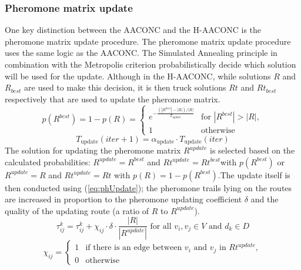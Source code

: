 \documentclass{article}
\begin{document}
	\subsubsection{Pheromone matrix update}
	One key distinction between the AACONC and the H-AACONC is the pheromone matrix update procedure.
	The pheromone matrix update procedure uses the same logic as the AACONC. The Simulated Annealing principle in combination with the Metropolis criterion probabilistically decide which solution will be used for the update. Although in the H-AACONC, while solutions $R$ and $R_{best}$ are used to make this decision, it is then truck solutions $Rt$ and $Rt_{best}$ respectively that are used to update the pheromone matrix.
	\begin{equation}
		p(R^{best}) = 1 - p(R) = 
		\begin{cases}
			e^{-\frac{(|R^{best}| - |R|)/|R|}{T_{update}}} & \text{for } |R^{best}| > |R|, \\
			1 & \text{otherwise}
		\end{cases}
		\label{eq:SA}
	\end{equation}
	\begin{equation}
		T_{\text{update}}(iter + 1) = \alpha_{\text{update}} \cdot T_{\text{update}}(iter)
		\label{eq:Tupdate}
	\end{equation}
	The solution for updating the pheromone matrix $R^{update}$ is selected based on the calculated probabilities:
	$R^{update} = R^{best}$ and $Rt^{update} = Rt^{best}$with $p(R^{best})$ or $R^{update} = R$ and $Rt^{update} = Rt$ with $p(R) = 1 - p(R^{best})$.The update itself is then conducted using (\ref{eq:phUpdate}); the pheromone trails lying on the routes are increased in proportion to the pheromone
	updating coefficient $\delta$ and the quality of the updating route (a ratio of $R$ to $R^{update}$).
	\begin{equation}
		\tau_{ij}^k = \tau_{ij}^k + \chi_{ij}\cdot \delta \cdot \frac{|R|}{|R^{update}|} \text{ for all } v_i,v_j \in V \text{ and } d_k\in D
		\label{eq:phUpdate}
	\end{equation}
	\begin{equation}
		\chi_{ij} = 
		\begin{cases}
			1 & \text{if there is an edge between }v_i \text{ and }v_j \text{ in }Rt^{update},\\
			0 & \text{otherwise}
		\end{cases}
	\end{equation}
	\;
\end{document}
